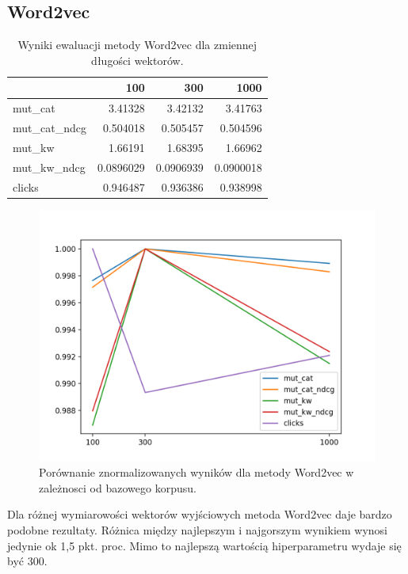 \documentclass[pl]{minipw} %
\begin{document}
\subsection{Word2vec}

\begin{table}[H]
	\centering
	\begin{tabular}{lrrr}
		\hline
		&       100 &       300 &      1000 \\
		\hline
		mut\_cat      & 3.41328   & 3.42132   & 3.41763   \\
		mut\_cat\_ndcg & 0.504018  & 0.505457  & 0.504596  \\
		mut\_kw       & 1.66191   & 1.68395   & 1.66962   \\
		mut\_kw\_ndcg  & 0.0896029 & 0.0906939 & 0.0900018 \\
		clicks       & 0.946487  & 0.936386  & 0.938998  \\
		\hline
	\end{tabular}
	\caption{Wyniki ewaluacji metody Word2vec dla zmiennej długości wektorów.}
\end{table}

\begin{figure}[H]
	\centering
	\includegraphics[width=1\textwidth]{img/results/w2v_ctr.png}
	\caption{Porównanie znormalizowanych wyników dla metody Word2vec w zależnosci od bazowego korpusu.}
\end{figure}

Dla różnej wymiarowości wektorów wyjściowych metoda Word2vec daje bardzo podobne rezultaty. Różnica między najlepszym i najgorszym wynikiem wynosi jedynie ok 1,5 pkt. proc. Mimo to najlepszą wartością hiperparametru wydaje się być 300.
\end{document}
